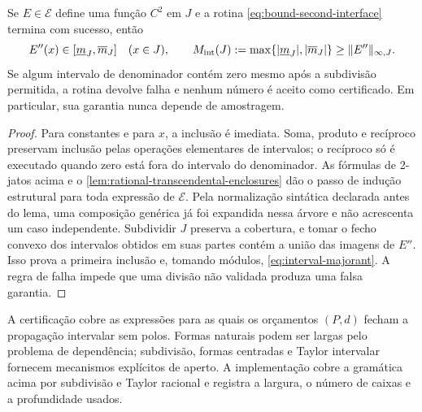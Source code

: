 \begin{proposition}
\label{prop:interval-majorant}
Se $E\in\mathcal E$ define uma função $C^2$ em $J$ e a rotina
\eqref{eq:bound-second-interface} termina com sucesso, então
\begin{equation}
 E''(x)\in[\underline m_J,\overline m_J]\quad(x\in J),
 \qquad
 M_{\rm int}(J):=\max\{|\underline m_J|,|\overline m_J|\}
 \ge \|E''\|_{\infty,J}.
 \label{eq:interval-majorant}
\end{equation}
Se algum intervalo de denominador contém zero mesmo após a subdivisão
permitida, a rotina devolve falha e nenhum número é aceito como certificado.
Em particular, sua garantia nunca depende de amostragem.
\end{proposition}

\begin{proof}
Para constantes e para $x$, a inclusão é imediata. Soma, produto e recíproco
preservam inclusão pelas operações elementares de intervalos; o recíproco só
é executado quando zero está fora do intervalo do denominador. As fórmulas de
2-jatos acima e o \cref{lem:rational-transcendental-enclosures}
dão o passo de indução estrutural para toda expressão de $\mathcal E$.
Pela normalização sintática declarada antes do lema, uma composição genérica
já foi expandida nessa árvore e não acrescenta um caso independente.
Subdividir $J$ preserva a cobertura, e tomar o fecho convexo dos intervalos
obtidos em suas partes contém a união das imagens de $E''$. Isso prova a
primeira inclusão e, tomando módulos, \eqref{eq:interval-majorant}. A regra de
falha impede que uma divisão não validada produza uma falsa garantia.
\end{proof}

A certificação cobre as expressões para as quais os orçamentos $(P,d)$ fecham
a propagação intervalar sem polos. Formas naturais podem ser largas pelo
problema de dependência; subdivisão, formas centradas e Taylor intervalar
fornecem mecanismos explícitos de aperto. A implementação cobre a gramática
acima por subdivisão e Taylor racional e registra a largura, o número de caixas
e a profundidade usados.

